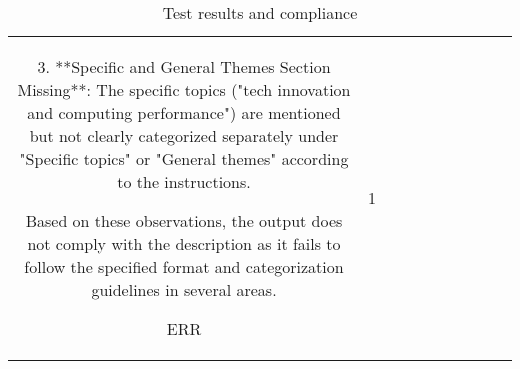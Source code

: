 \begin{table}[h!]
\begin{tabular}{|c|c|c|c|c|c|c|c|c|c|}
3. **Specific and General Themes Section Missing**: The specific topics ("tech innovation and computing performance") are mentioned but not clearly categorized separately under "Specific topics" or "General themes" according to the instructions.

Based on these observations, the output does not comply with the description as it fails to follow the specified format and categorization guidelines in several areas.

ERR & 1
  \end{tabular}
  \caption{Test results and compliance}
  
  \end{table}
  